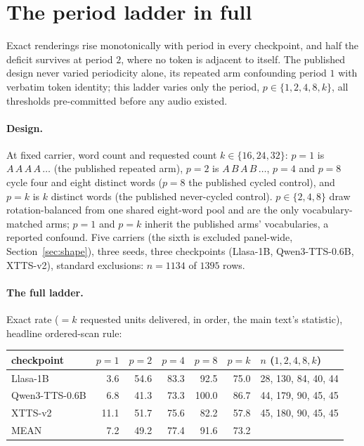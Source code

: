 \section{The period ladder in full}
\label{sec:period}

Exact renderings rise monotonically with period in every checkpoint,
and half the deficit survives at period $2$, where no token is
adjacent to itself. The published design never varied periodicity
alone, its repeated arm confounding period $1$ with verbatim token
identity; this ladder varies only the period, $p\in\{1,2,4,8,k\}$,
all thresholds pre-committed before any audio existed.

\paragraph{Design.} At fixed carrier, word count and requested count
$k\in\{16,24,32\}$: $p{=}1$ is $A\,A\,A\,A\,\dots$ (the published
repeated arm), $p{=}2$ is $A\,B\,A\,B\,\dots$, $p{=}4$ and $p{=}8$
cycle four and eight distinct words ($p{=}8$ the published cycled
control), and $p{=}k$ is $k$ distinct words (the published
never-cycled control). $p\in\{2,4,8\}$ draw rotation-balanced from
one shared eight-word pool and are the only vocabulary-matched arms;
$p{=}1$ and $p{=}k$ inherit the published arms' vocabularies, a
reported confound. Five carriers (the sixth is excluded panel-wide,
Section~\ref{sec:shape}), three seeds, three checkpoints (Llasa-1B,
Qwen3-TTS-0.6B, XTTS-v2), standard exclusions: $n=1134$ of $1395$
rows.

\paragraph{The full ladder.} Exact rate ($=k$ requested units delivered, in
order, the main text's statistic), headline ordered-scan rule:

\begin{center}
\begin{tabular}{@{}lrrrrrl@{}}
\toprule
checkpoint & $p{=}1$ & $p{=}2$ & $p{=}4$ & $p{=}8$ & $p{=}k$ & $n$ ($1,2,4,8,k$) \\
\midrule
Llasa-1B         &  3.6 & 54.6 & 83.3 &  92.5 & 75.0 & 28, 130, 84, 40, 44 \\
Qwen3-TTS-0.6B   &  6.8 & 41.3 & 73.3 & 100.0 & 86.7 & 44, 179, 90, 45, 45 \\
XTTS-v2          & 11.1 & 51.7 & 75.6 &  82.2 & 57.8 & 45, 180, 90, 45, 45 \\
\midrule
MEAN             &  7.2 & 49.2 & 77.4 &  91.6 & 73.2 & \\
\bottomrule
\end{tabular}
\end{center}

